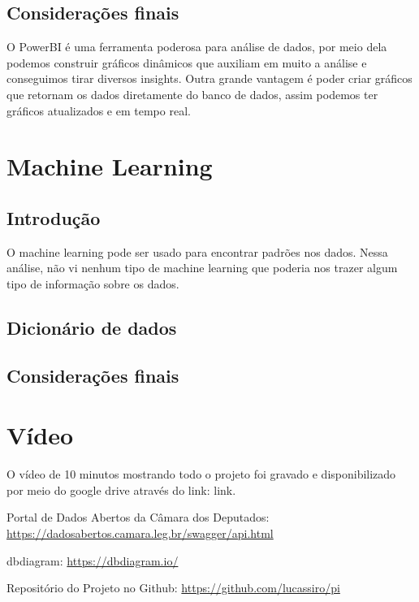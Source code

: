 \documentclass[12pt, a4paper]{article}
\begin{document}
\subsection{Considerações finais}

O PowerBI é uma ferramenta poderosa para análise de dados, por meio dela podemos construir gráficos dinâmicos que auxiliam em muito a análise e conseguimos tirar diversos insights.
Outra grande vantagem é poder criar gráficos que retornam os dados diretamente do banco de dados, assim podemos ter gráficos atualizados e em tempo real.

\section{Machine Learning}
\subsection{Introdução}
O machine learning pode ser usado para encontrar padrões nos dados. Nessa análise, não vi nenhum tipo de machine learning que poderia nos trazer algum tipo de informação sobre os dados.

\subsection{Dicionário de dados}

\subsection{Considerações finais}

\section{Vídeo}
O vídeo de 10 minutos mostrando todo o projeto foi gravado e disponibilizado por meio do google drive através do link: link.

\begin{thebibliography}{9}
     Portal de Dados Abertos da Câmara dos Deputados: 
    \href{https://dadosabertos.camara.leg.br/swagger/api.html}{https://dadosabertos.camara.leg.br/swagger/api.html}

     dbdiagram: 
    \href{https://dbdiagram.io/}{https://dbdiagram.io/}

     Repositório do Projeto no Github: 
    \href{https://github.com/lucassiro/pi}{https://github.com/lucassiro/pi}
\end{thebibliography}
\end{document}
